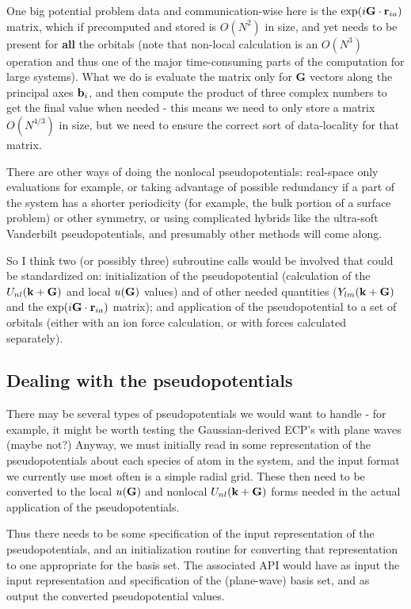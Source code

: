 One big potential problem data and
communication-wise here is the $\exp(i {\bf G}\cdot {\bf r}_{ia})$ matrix,
which if precomputed and stored is $O(N^2)$ in size, and yet needs to be present
for {\bf all} the orbitals (note that non-local calculation is an $O(N^3)$
operation and thus one of the major time-consuming parts of the computation
for large systems). What we do is evaluate the matrix only for {\bf G}
vectors along the principal axes ${\bf b}_i$, and then compute the product
of three complex numbers to get the final value when needed - this means
we need to only store a matrix $O(N^{4/3})$ in size, but we need to
ensure the correct sort of data-locality for that matrix.

There are other ways of doing the nonlocal pseudopotentials: real-space only
evaluations for example, or taking advantage of possible redundancy if a part
of the system has a shorter periodicity (for example, the bulk portion of
a surface problem) or other symmetry, or using complicated hybrids like
the ultra-soft Vanderbilt pseudopotentials, and presumably other methods
will come along.

So I think two (or possibly three) subroutine calls would be involved
that could be standardized on: initialization of the pseudopotential
(calculation of the $U_{nl}({\bf k+ G})$ and local $u({\bf G})$ values)
and of other needed quantities ($Y_{lm}({\bf k + G})$ and the
$\exp(i {\bf G}\cdot {\bf r}_{ia})$ matrix); and application of
the pseudopotential to a set of orbitals (either with an ion force
calculation, or with forces calculated separately).

\subsection{Dealing with the pseudopotentials}

There may be several types of pseudopotentials we would want to
handle - for example, it might be worth testing the Gaussian-derived
ECP's with plane waves (maybe not?) Anyway, we must initially
read in some representation of the pseudopotentials about each species
of atom in the system, and the input format we currently use most
often is a simple radial grid. These then need to be converted to
the local $u({\bf G})$ and nonlocal $U_{nl}({\bf k+G})$ forms needed in
the actual application of the pseudopotentials.

Thus there needs to be some specification of the input representation
of the pseudopotentials, and an initialization routine for converting
that representation to one appropriate for the basis set. The associated
API would have as input the input representation and specification
of the (plane-wave) basis set, and as output the converted pseudopotential
values.

